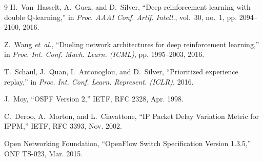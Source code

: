 \documentclass[10pt,twocolumn,a4paper]{article}
\begin{document}
\begin{thebibliography}{9}
H.~Van~Hasselt, A.~Guez, and D.~Silver, ``Deep reinforcement learning with double Q-learning,'' in \emph{Proc. AAAI Conf. Artif. Intell.}, vol.~30, no.~1, pp. 2094--2100, 2016.

Z.~Wang \emph{et~al.}, ``Dueling network architectures for deep reinforcement learning,'' in \emph{Proc. Int. Conf. Mach. Learn. (ICML)}, pp. 1995--2003, 2016.

T.~Schaul, J.~Quan, I.~Antonoglou, and D.~Silver, ``Prioritized experience replay,'' in \emph{Proc. Int. Conf. Learn. Represent. (ICLR)}, 2016.

J.~Moy, ``{OSPF Version 2},'' IETF, RFC 2328, Apr. 1998.

C.~Deroo, A.~Morton, and L.~Ciavattone, ``{IP Packet Delay Variation Metric for IPPM},'' IETF, RFC 3393, Nov. 2002.

Open Networking Foundation, ``OpenFlow Switch Specification Version 1.3.5,'' ONF TS-023, Mar. 2015.
\end{thebibliography}
\end{document}
